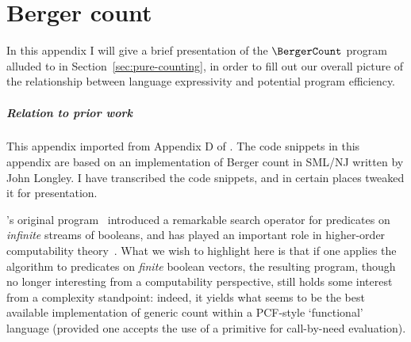 \documentclass[12pt,phd,lfcs,twoside,openright,logo,leftchapter,normalheadings]{infthesis}
\theoremstyle{plain}
\theoremstyle{definition}
\begin{document}
\chapter{Berger count}
\label{sec:berger-count}
In this appendix I will give a brief presentation of the
$\BergerCount$ program alluded to in Section~\ref{sec:pure-counting},
in order to fill out our overall picture of the relationship between
language expressivity and potential program efficiency.

\paragraph{Relation to prior work} This appendix imported from
Appendix D of \citet{HillerstromLL20a}. The code snippets in this
appendix are based on an implementation of Berger count in SML/NJ
written by John Longley. I have transcribed the code snippets, and in
certain places tweaked it for presentation.\medskip

\citeauthor{Berger90}'s original program~\cite{Berger90} introduced a
remarkable search operator for predicates on \emph{infinite} streams
of booleans, and has played an important role in higher-order
computability theory~\cite{LongleyN15}.  What we wish to highlight
here is that if one applies the algorithm to predicates on
\emph{finite} boolean vectors, the resulting program, though no longer
interesting from a computability perspective, still holds some
interest from a complexity standpoint: indeed, it yields what seems to
be the best available implementation of generic count within a
PCF-style `functional' language (provided one accepts the use of a
primitive for call-by-need evaluation).
\end{document}
